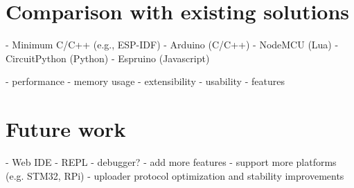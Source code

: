 \documentclass[
  digital,
  oneside,
  nosansbold,
  nocolorbold,
  lof,
  lot
]{fithesis4}
\begin{document}














\chapter{Comparison with existing solutions}

  - Minimum C/C++ (e.g., ESP-IDF)
  - Arduino (C/C++)
  - NodeMCU (Lua)
  - CircuitPython (Python)
  - Espruino (Javascript)

  - performance
  - memory usage
  - extensibility
  - usability
  - features


\chapter{Future work}

  - Web IDE
  - REPL
  - debugger?
  - add more features
  - support more platforms (e.g. STM32, RPi)
  - uploader protocol optimization and stability improvements
\end{document}

